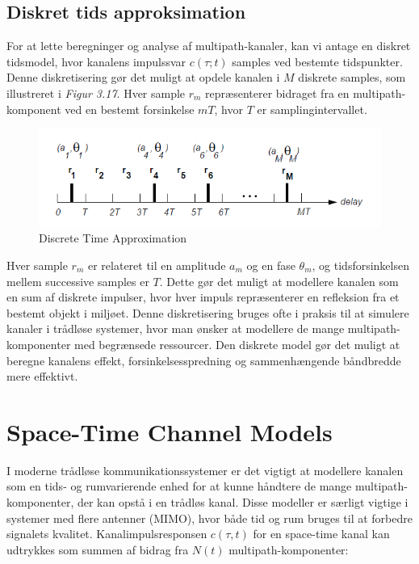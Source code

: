\documentclass[a4paper,12pt]{book}
\begin{document}
	\subsection{Diskret tids approksimation}
	For at lette beregninger og analyse af multipath-kanaler, kan vi antage en diskret tidsmodel, hvor kanalens impulssvar \( c(\tau; t) \) samples ved bestemte tidspunkter. Denne diskretisering gør det muligt at opdele kanalen i \(M\) diskrete samples, som illustreret i \textit{Figur 3.17}. Hver sample \( r_m \) repræsenterer bidraget fra en multipath-komponent ved en bestemt forsinkelse \( mT \), hvor \(T\) er samplingintervallet.
	
	\begin{figure}[!h]
		\centering\includegraphics[width=\textwidth]{fig/fig31.png}
		\caption{Discrete Time Approximation}
	\end{figure}

	Hver sample \( r_m \) er relateret til en amplitude \( a_m \) og en fase \( \theta_m \), og tidsforsinkelsen mellem successive samples er \( T \). Dette gør det muligt at modellere kanalen som en sum af diskrete impulser, hvor hver impuls repræsenterer en refleksion fra et bestemt objekt i miljøet.
	\newline\newline
	Denne diskretisering bruges ofte i praksis til at simulere kanaler i trådløse systemer, hvor man ønsker at modellere de mange multipath-komponenter med begrænsede ressourcer. Den diskrete model gør det muligt at beregne kanalens effekt, forsinkelsesspredning og sammenhængende båndbredde mere effektivt.
	
	\section{Space-Time Channel Models}
	I moderne trådløse kommunikationssystemer er det vigtigt at modellere kanalen som en tids- og rumvarierende enhed for at kunne håndtere de mange multipath-komponenter, der kan opstå i en trådløs kanal. Disse modeller er særligt vigtige i systemer med flere antenner (MIMO), hvor både tid og rum bruges til at forbedre signalets kvalitet.
	\newline\newline
	Kanalimpulsresponsen \(c(\tau, t)\) for en space-time kanal kan udtrykkes som summen af bidrag fra \(N(t)\) multipath-komponenter:
	
\end{document}
